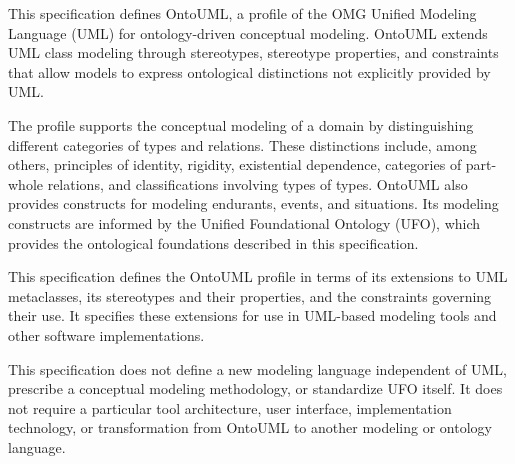 This specification defines OntoUML, a profile of the OMG Unified Modeling Language (UML) for ontology-driven conceptual modeling. OntoUML extends UML class modeling through stereotypes, stereotype properties, and constraints that allow models to express ontological distinctions not explicitly provided by UML.

The profile supports the conceptual modeling of a domain by distinguishing different categories of types and relations. These distinctions include, among others, principles of identity, rigidity, existential dependence, categories of part-whole relations, and classifications involving types of types. OntoUML also provides constructs for modeling endurants, events, and situations. Its modeling constructs are informed by the Unified Foundational Ontology (UFO)\cite{towards_ontological_foundations_for_conceptual_modeling__the_unified_foundational_ontology__ufo__story_2015,ufo_unified_foundational_ontology_2021, gUFO_a_gentle_foundational_ontology_for_semantic_web_knowledge_graphs_2026}, which provides the ontological foundations described in this specification.

This specification defines the OntoUML profile in terms of its extensions to UML metaclasses, its stereotypes and their properties, and the constraints governing their use. It specifies these extensions for use in UML-based modeling tools and other software implementations.

This specification does not define a new modeling language independent of UML, prescribe a conceptual modeling methodology, or standardize UFO itself. It does not require a particular tool architecture, user interface, implementation technology, or transformation from OntoUML to another modeling or ontology language.